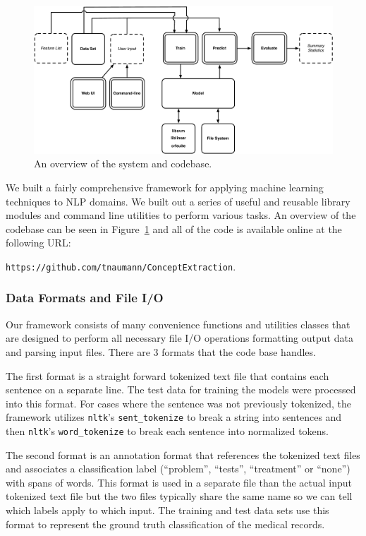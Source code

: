 \documentclass[preprint]{style}
\begin{document}
\begin{figure}
\begin{center}
	\includegraphics[width=2\columnwidth]{figures/system.pdf}
\end{center}
\caption{An overview of the system and codebase.}
\label{fig:system}
\end{figure}


We built a fairly comprehensive framework for applying machine learning techniques to NLP domains. We built out a series of useful and reusable library modules and command line utilities to perform various tasks. An overview of the codebase can be seen in Figure~\ref{fig:system} and  all of the code is available online at the following URL:

{\tt https://github.com/tnaumann/ConceptExtraction}.

\subsubsection{Data Formats and File I/O}

Our framework consists of many convenience functions and utilities classes that are designed to perform all necessary file I/O operations formatting output data and parsing input files. There are 3 formats that the code base handles. 

The first format is a straight forward tokenized text file that contains each sentence on a separate line. The test data for training the models were processed into this format. For cases where the sentence was not previously tokenized, the framework utilizes {\tt nltk}'s {\tt sent\_tokenize}  to break a string into sentences and then {\tt nltk}'s {\tt word\_tokenize} to break each sentence into normalized tokens.

The second format is an annotation format that references the tokenized text files and associates a classification label (``problem'', ``tests'', ``treatment'' or ``none'') with spans of words. This format is used in a separate file than the actual input tokenized text file but the two files typically share the same name so we can tell which labels apply to which input. The training and test data sets use this format to represent the ground truth classification of the medical records.
\end{document}
